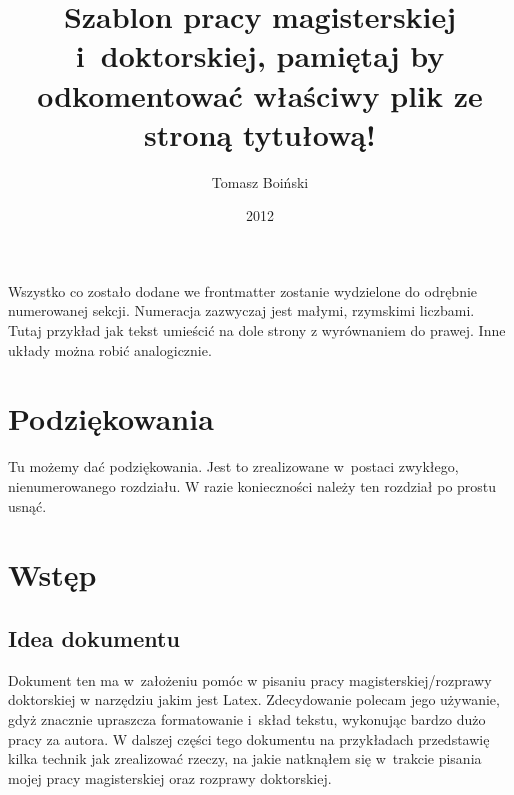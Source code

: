 \documentclass[twoside,a4paper]{book}
\title{Szablon pracy magisterskiej i~doktorskiej, pamiętaj by odkomentować właściwy plik ze stroną tytułową!}
\author{Tomasz Boiński}
\date{2012}
\begin{document}
\frontmatter
\maketitle
\tableofcontents

\newpage
\null
\vfill
\begin{flushright}
  Wszystko co zostało dodane we frontmatter zostanie wydzielone do odrębnie numerowanej sekcji. Numeracja zazwyczaj jest małymi, rzymskimi liczbami. Tutaj przykład jak tekst umieścić na dole strony z wyrównaniem do prawej. Inne układy można robić analogicznie.
\end{flushright}

\chapter*{Podziękowania}
Tu możemy dać podziękowania. Jest to zrealizowane w~postaci zwykłego, nienumerowanego rozdziału. W razie konieczności należy ten rozdział po prostu usnąć.

\mainmatter

\chapter{Wstęp}
\section{Idea dokumentu}

Dokument ten ma w~założeniu pomóc w pisaniu pracy magisterskiej/rozprawy doktorskiej w narzędziu jakim jest Latex. Zdecydowanie polecam jego używanie, gdyż znacznie upraszcza formatowanie i~skład tekstu, wykonując bardzo dużo pracy za autora. W dalszej części tego dokumentu na przykładach przedstawię kilka technik jak zrealizować rzeczy, na jakie natknąłem się w~trakcie pisania mojej pracy magisterskiej oraz rozprawy doktorskiej.
\end{document}
